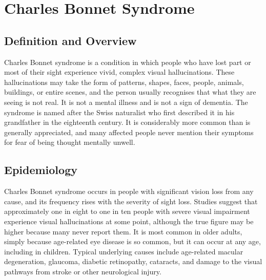 \chapter{Charles Bonnet Syndrome}

\section*{Definition and Overview}
Charles Bonnet syndrome is a condition in which people who have lost part or most of their sight experience vivid, complex visual hallucinations. These hallucinations may take the form of patterns, shapes, faces, people, animals, buildings, or entire scenes, and the person usually recognises that what they are seeing is not real. It is not a mental illness and is not a sign of dementia. The syndrome is named after the Swiss naturalist who first described it in his grandfather in the eighteenth century. It is considerably more common than is generally appreciated, and many affected people never mention their symptoms for fear of being thought mentally unwell.

\section*{Epidemiology}
Charles Bonnet syndrome occurs in people with significant vision loss from any cause, and its frequency rises with the severity of sight loss. Studies suggest that approximately one in eight to one in ten people with severe visual impairment experience visual hallucinations at some point, although the true figure may be higher because many never report them. It is most common in older adults, simply because age-related eye disease is so common, but it can occur at any age, including in children. Typical underlying causes include age-related macular degeneration, glaucoma, diabetic retinopathy, cataracts, and damage to the visual pathways from stroke or other neurological injury.

